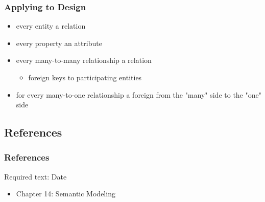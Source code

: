 \documentclass[dvipsnames]{beamer}
\begin{document}
\begin{frame}
  \frametitle{Applying to Design}

  \begin{itemize}
    \item every entity a relation

    \pause
    \item every property an attribute

    \pause
    \item every many-to-many relationship a relation
    \begin{itemize}
      \item foreign keys to participating entities
    \end{itemize}

    \pause
    \item for every many-to-one relationship a foreign from the
      "many" side to the "one" side
 \end{itemize}
\end{frame}

\subsection*{References}

\begin{frame}
  \frametitle{References}

  \begin{block}{Required text: Date}
    \begin{itemize}
      \item Chapter 14: \alert{Semantic Modeling}
    \end{itemize}
  \end{block}
\end{frame}
\end{document}

